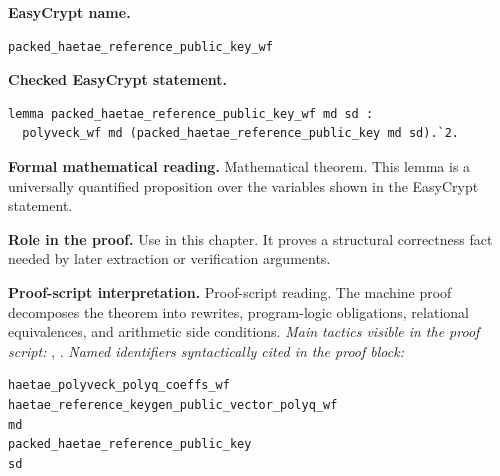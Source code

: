 \begin{formaltheorem}
\noindent\textbf{EasyCrypt name.}
\begin{lstlisting}[language=EasyCrypt,basicstyle=\ttfamily\scriptsize]
packed_haetae_reference_public_key_wf
\end{lstlisting}
\noindent\textbf{Checked EasyCrypt statement.}
\begin{lstlisting}[language=EasyCrypt,basicstyle=\ttfamily\scriptsize]
lemma packed_haetae_reference_public_key_wf md sd :
  polyveck_wf md (packed_haetae_reference_public_key md sd).`2.
\end{lstlisting}
\noindent\textbf{Formal mathematical reading.}
Mathematical theorem. This lemma is a universally quantified proposition over the variables shown in the EasyCrypt statement.

\noindent\textbf{Role in the proof.}
Use in this chapter. It proves a structural correctness fact needed by later extraction or verification arguments.

\noindent\textbf{Proof-script interpretation.}
Proof-script reading. The machine proof decomposes the theorem into rewrites, program-logic obligations, relational equivalences, and arithmetic side conditions.
\emph{Main tactics visible in the proof script:} , .
\emph{Named identifiers syntactically cited in the proof block:}
\begin{lstlisting}[language=EasyCrypt,basicstyle=\ttfamily\scriptsize]
haetae_polyveck_polyq_coeffs_wf
haetae_reference_keygen_public_vector_polyq_wf
md
packed_haetae_reference_public_key
sd
\end{lstlisting}

\end{formaltheorem}


